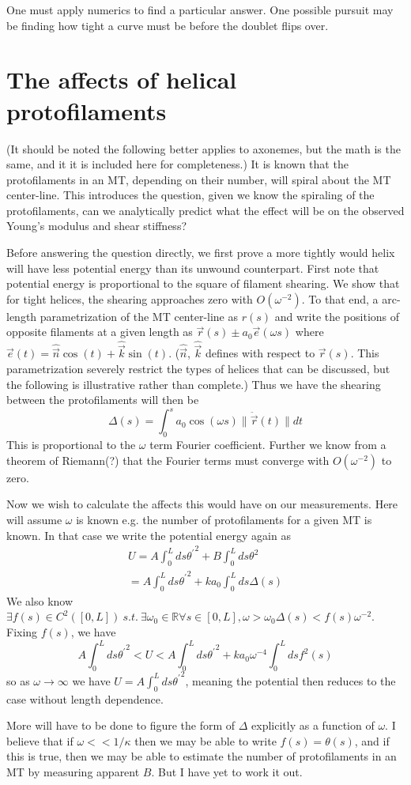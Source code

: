 \documentclass{article}
\theoremstyle{exampstyle} \newtheorem*{remark}{Remark}
\newcommand{\1}{\mathds{1}}
\begin{document}
One must apply numerics to find a particular answer. One possible pursuit may be finding how tight a curve must be before the doublet flips over.

\section{The affects of helical protofilaments}


(It should be noted the following better applies to axonemes, but the math is the same, and it it is included here for completeness.) It is known that the protofilaments in an MT, depending on their number, will spiral about the MT center-line. This introduces the question, given we know the spiraling of the protofilaments, can we analytically predict what the effect will be on the observed Young's modulus and shear stiffness? 

Before answering the question directly, we first prove a more tightly would helix will have less potential energy than its unwound counterpart. First note that potential energy is proportional to the square of filament shearing. We show that for tight helices, the shearing approaches zero with $O(\omega^{-2})$. To that end, a arc-length parametrization of the MT center-line as $r(s)$ and write the positions of opposite filaments at a given length as $\vec{r}(s)\pm a_0\vec{e}(\omega s)$ where $\vec{e}(t)=\hat{\vec{n}}\cos(t)+\hat{\vec{k}}\sin(t)$. ($\hat{\vec{n}}$, $\hat{\vec{k}}$ defines with respect to $\vec{r}(s)$. This parametrization severely restrict the types of helices that can be discussed, but the following is illustrative rather than complete.) Thus we have the shearing between the protofilaments will then be 
$$ \Delta(s)=\int_0^s a_0\cos(\omega s)\| \ddot{\vec{r}}(t) \| dt $$
This is proportional to the $\omega$ term Fourier coefficient. Further we know from a theorem of Riemann(?) that the Fourier terms must converge with $O(\omega^{-2})$ to zero. 

Now we wish to calculate the affects this would have on our measurements. Here will assume $\omega$ is known e.g. the number of protofilaments for a given MT is known. In that case we write the potential energy again as 
\begin{align*}
U=A\int_0^L ds {\theta^\prime}^2 +B\int_0^L ds \theta^2 \\
=A\int_0^L ds {\theta^\prime}^2 +ka_0\int_0^L ds \Delta (s)
\end{align*}  
We also know $ \exists f(s)\in C^2([0,L])\ s.t.\ \exists \omega_0\in\mathbb{R} \forall s\in [0,L],\omega>\omega_0 \Delta(s)<f(s)\omega^{-2} $. Fixing $f(s)$, we have
$$ A\int_0^L ds {\theta^\prime}^2<U<A\int_0^L ds {\theta^\prime}^2 +ka_0\omega^{-4}\int_0^L ds f^2(s) $$ 
so as $\omega\to \infty$ we have $ U=A\int_0^L ds {\theta^\prime}^2 $, meaning the potential then reduces to the case without length dependence. 

More will have to be done to figure the form of $\Delta$ explicitly as a function of $\omega$. I believe that if $ \omega<<1/\kappa $ then we may be able to write $f(s)=\theta(s)$, and if this is true, then we may be able to estimate the number of protofilaments in an MT by measuring apparent $B$. But I have yet to work it out.   
\end{document}
